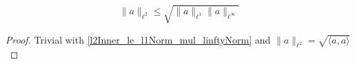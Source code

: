 \begin{lemma}
    \label{l2Norm_le_sqrt_l1Norm_mul_linftyNorm}
    \leanok
    $$\lVert a \rVert_{\ell^2} \leq \sqrt{\lVert a \rVert_{\ell^1} \lVert a \rVert_{\ell^\infty}}$$
\end{lemma}

\begin{proof}
    \leanok
    Trivial with \ref{l2Inner_le_l1Norm_mul_linftyNorm} and $\lVert a \rVert_{\ell^2} = \sqrt{\langle a, a \rangle}$
\end{proof}